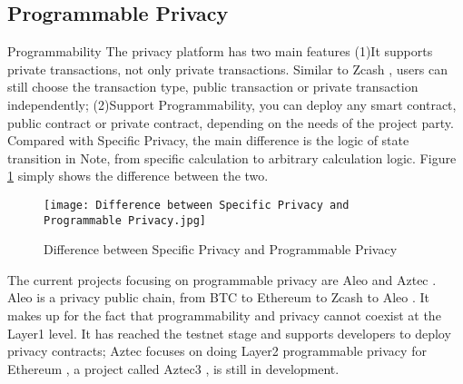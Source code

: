 \subsection{Programmable Privacy}

Programmability The privacy platform has two main features (1)It supports private 
transactions, not only private transactions. Similar to Zcash \cite{website:Zcash}, users can still 
choose the transaction type, public transaction or private transaction independently; 
(2)Support Programmability, you can deploy any smart contract, public contract or 
private contract, depending on the needs of the project party. Compared with Specific 
Privacy, the main difference is the logic of state transition in Note, from specific 
calculation to arbitrary calculation logic. Figure \ref{fig:Difference between Specific Privacy and Programmable Privacy} simply shows the difference 
between the two.
\begin{figure}[!ht]
    \centering
    \texttt{[image: Difference between Specific Privacy and Programmable Privacy.jpg]}
    \caption{Difference between Specific Privacy and Programmable Privacy}
    \label{fig:Difference between Specific Privacy and Programmable Privacy}
\end{figure}

The current projects focusing on programmable privacy are Aleo \cite{website:Aleo} and Aztec \cite{website:Aztec}. Aleo \cite{website:Aleo} is a 
privacy public chain, from BTC \cite{website:BTC} to Ethereum \cite{website:Ethereum} to Zcash \cite{website:Zcash} to Aleo \cite{website:Aleo}. It makes up for 
the fact that programmability and privacy cannot coexist at the Layer1 level. 
It has reached the testnet stage and supports developers to deploy privacy contracts; 
Aztec \cite{website:Aztec} focuses on doing Layer2 programmable privacy for Ethereum \cite{website:Ethereum} , a project 
called Aztec3 \cite{website:Aztec3}, is still in development.